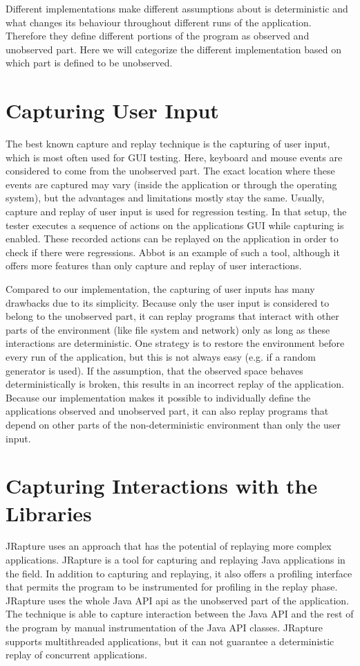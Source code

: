 Different implementations make different assumptions about is deterministic and what changes its behaviour throughout different runs of the application. Therefore they define different portions of the program as observed and unobserved part. Here we will categorize the different implementation based on which part is defined to be unobserved.

\section {Capturing User Input}
The best known capture and replay technique is the capturing of user input, which is most often used for GUI testing. Here, keyboard and mouse events are considered to come from the unobserved part. The exact location where these events are captured may vary (inside the application or through the operating system), but the advantages and limitations mostly stay the same. Usually, capture and replay of user input is used for regression testing. In that setup, the tester executes a sequence of actions on the applications GUI while capturing is enabled. These recorded actions can be replayed on the application in order to check if there were regressions. Abbot \cite{abbot} is an example of such a tool, although it offers more features than only capture and replay of user interactions.

Compared to our implementation, the capturing of user inputs has many drawbacks due to its simplicity. Because only the user input is considered to belong to the unobserved part, it can replay programs that interact with other parts of the environment (like file system and network) only as long as these interactions are deterministic. One strategy is to restore the environment before every run of the application, but this is not always easy (e.g. if a random generator is used). If the assumption, that the observed space behaves deterministically is broken, this results in an incorrect replay of the application. Because our implementation makes it possible to individually define the applications observed and unobserved part, it can also replay programs that depend on other parts of the non-deterministic environment than only the user input.

\section {Capturing Interactions with the Libraries}
JRapture \cite{jrapture} uses an approach that has the potential of replaying more complex applications. JRapture is a tool for capturing and replaying Java applications in the field. In addition to capturing and replaying, it also offers a profiling interface that permits the program to be instrumented for profiling in the replay phase. JRapture uses the whole Java API api as the unobserved part of the application. The technique is able to capture interaction between the Java API and the rest of the program by manual instrumentation of the Java API classes. JRapture supports multithreaded applications, but it can not guarantee a deterministic replay of concurrent applications.

